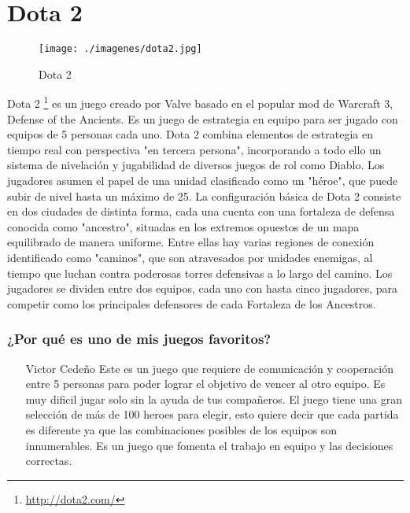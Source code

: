 \section{Dota 2}

\begin{figure}[htbp]
\begin{center}
\texttt{[image: ./imagenes/dota2.jpg]}
\caption{Dota 2}
\label{Dota 2}
\end{center}
\end{figure}
Dota 2 \footnote{\url{http://dota2.com/}} es un juego creado por Valve basado en el popular mod de Warcraft 3, Defense of the Ancients. Es un juego de estrategia en equipo para ser jugado con equipos de 5 personas cada uno.
Dota 2 combina elementos de estrategia en tiempo real con perspectiva "en tercera persona", incorporando a todo ello un sistema de nivelación y jugabilidad de diversos juegos de rol como Diablo. Los jugadores asumen el papel de una unidad clasificado como un "héroe", que puede subir de nivel hasta un máximo de 25. La configuración básica de Dota 2 consiste en dos ciudades de distinta forma, cada una cuenta con una fortaleza de defensa conocida como "ancestro", situadas en los extremos opuestos de un mapa equilibrado de manera uniforme. Entre ellas hay varias regiones de conexión identificado como "caminos", que son atravesados por unidades enemigas, al tiempo que luchan contra poderosas torres defensivas a lo largo del camino. Los jugadores se dividen entre dos equipos, cada uno con hasta cinco jugadores, para competir como los principales defensores de cada Fortaleza de los Ancestros.

\subsubsection{¿Por qué es uno de mis juegos favoritos?}
\begin{itemize}
\item[Victor Cedeño] Este es un juego que requiere de comunicación y cooperación entre 5 personas para poder lograr el objetivo de vencer al otro equipo. Es muy dificil jugar solo sin la ayuda de tus compañeros. El juego tiene una gran selección de más de 100 heroes para elegir, esto quiere decir que cada partida es diferente ya que las combinaciones posibles de los equipos son innumerables. Es un juego que fomenta el trabajo en equipo y las decisiones correctas.
\end{itemize}
